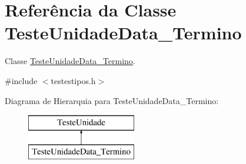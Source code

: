 \hypertarget{class_teste_unidade_data___termino}{
\section{\-Referência da \-Classe \-Teste\-Unidade\-Data\-\_\-\-Termino}
\label{class_teste_unidade_data___termino}
}


\-Classe \hyperlink{class_teste_unidade_data___termino}{\-Teste\-Unidade\-Data\-\_\-\-Termino}.  




{\ttfamily \#include $<$testestipos.\-h$>$}

\-Diagrama de \-Hierarquia para \-Teste\-Unidade\-Data\-\_\-\-Termino\-:\begin{figure}[H]
\begin{center}
\leavevmode
\includegraphics[height=2.000000cm]{class_teste_unidade_data___termino}
\end{center}
\end{figure}
